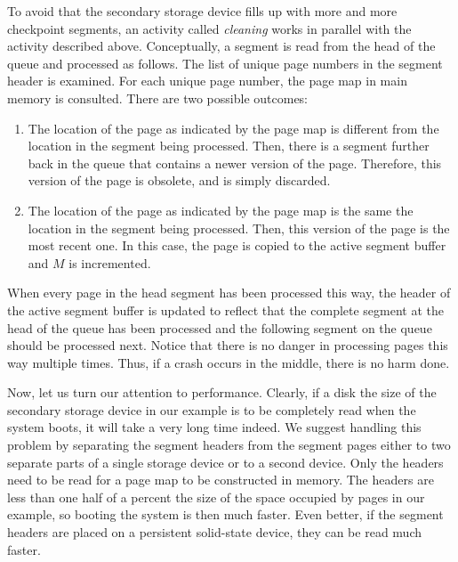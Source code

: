 To avoid that the secondary storage device fills up with more and more
checkpoint segments, an activity called \emph{cleaning} works in
parallel with the activity described above.  Conceptually, a segment
is read from the head of the queue and processed as follows.  The
list of unique page numbers in the segment header is examined.  For
each unique page number, the page map in main memory is consulted.
There are two possible outcomes:

\begin{enumerate}
\item The location of the page as indicated by the page map is
  different from the location in the segment being processed.  Then,
  there is a segment further back in the queue that contains a newer
  version of the page.  Therefore, this version of the page is
  obsolete, and is simply discarded.
\item The location of the page as indicated by the page map is the
  same the location in the segment being processed.  Then, this
  version of the page is the most recent one.  In this case, the page
  is copied to the active segment buffer and $M$ is incremented.
\end{enumerate}

When every page in the head segment has been processed this way, the
header of the active segment buffer is updated to reflect that the
complete segment at the head of the queue has been processed and the
following segment on the queue should be processed next.  Notice that
there is no danger in processing pages this way multiple times.  Thus,
if a crash occurs in the middle, there is no harm done.

Now, let us turn our attention to performance.  Clearly, if a disk the
size of the secondary storage device in our example is to be
completely read when the system boots, it will take a very long time
indeed.  We suggest handling this problem by separating the segment
headers from the segment pages either to two separate parts of a
single storage device or to a second device.  Only the headers need to
be read for a page map to be constructed in memory.  The headers are
less than one half of a percent the size of the space occupied by
pages in our example, so booting the system is then much faster.  Even
better, if the segment headers are placed on a persistent solid-state
device, they can be read much faster.
